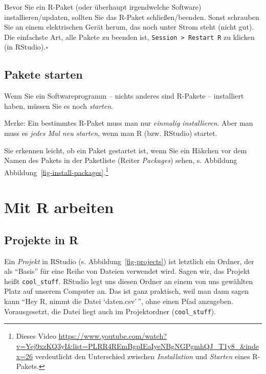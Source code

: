 \documentclass[
  a4paper,
  DIV=11]{scrreprt}
\theoremstyle{definition}
\theoremstyle{definition}
\theoremstyle{definition}
\theoremstyle{remark}
\begin{document}
\begin{tcolorbox}[enhanced jigsaw, leftrule=.75mm, opacitybacktitle=0.6, colback=white, colframe=quarto-callout-caution-color-frame, coltitle=black, colbacktitle=quarto-callout-caution-color!10!white, opacityback=0, left=2mm, breakable, titlerule=0mm, toptitle=1mm, bottomtitle=1mm, rightrule=.15mm, title=\textcolor{quarto-callout-caution-color}{\faFire}\hspace{0.5em}{Vorsicht}, arc=.35mm, bottomrule=.15mm, toprule=.15mm]

Bevor Sie ein R-Paket (oder überhaupt irgendwelche Software)
installieren/updaten, sollten Sie das R-Paket schließen/beenden. Sonst
schrauben Sie an einem elektrischen Gerät herum, das noch unter Strom
steht (nicht gut). Die einfachste Art, alle Pakete zu beenden ist,
\texttt{Session\ \textgreater{}\ Restart\ R} zu klicken (in
RStudio).\(\square\)

\end{tcolorbox}

\subsection{Pakete starten}\label{pakete-starten}

Wenn Sie ein Softwareprogramm -- nichts anderes sind R-Pakete --
installiert haben, müssen Sie es noch \emph{starten}.

Merke: Ein bestimmtes R-Paket muss man nur \emph{einmalig installieren}.
Aber man muss es \emph{jedes Mal neu starten}, wenn man R (bzw. RStudio)
startet.

Sie erkennen leicht, ob ein Paket gestartet ist, wenn Sie ein Häkchen
vor dem Namen des Pakets in der Paketliste (Reiter \emph{Packages})
sehen, s. Abbildung Abbildung~\ref{fig-install-packages}.\footnote{Dieses
  Video
  \url{https://www.youtube.com/watch?v=Yej9xzKQ3yI&list=PLRR4REmBgpIEaIyeNBgNGPgmhQJ_T1y8_&index=26}
  verdeutlicht den Unterschied zwischen \emph{Installation} und
  \emph{Starten} eines R-Pakets.}

\section{Mit R arbeiten}\label{mit-r-arbeiten}

\subsection{Projekte in R}\label{projekte-in-r}

Ein \emph{Projekt} in RStudio (s. Abbildung~\ref{fig-projects}) ist
letztlich ein Ordner, der als ``Basis'' für eine Reihe von Dateien
verwendet wird. Sagen wir, das Projekt heißt \texttt{cool\_stuff}.
RStudio legt uns diesen Ordner an einem von uns gewählten Platz auf
unserem Computer an. Das ist ganz praktisch, weil man dann sagen kann
``Hey R, nimmt die Datei `daten.csv'\,'', ohne einen Pfad anzugeben.
Vorausgesetzt, die Datei liegt auch im Projektordner
(\texttt{cool\_stuff}).
\end{document}
